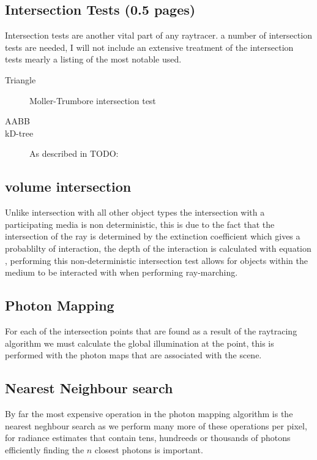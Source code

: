 \subsection{Intersection Tests (0.5 pages)}
Intersection tests are another vital part of any raytracer. a number of intersection tests are needed, I will not include
an extensive treatment of the intersection tests mearly a listing of the most notable used.

\begin{description}
\item[Triangle] Moller-Trumbore intersection test \cite{MolTru97}
\item[AABB]
\item[kD-tree] As described in TODO:
\end{description}

\subsection{volume intersection}
Unlike intersection with all other object types the intersection with a participating media is non deterministic, this is
due to the fact that the intersection of the ray is determined by the extinction coefficient which gives a probablilty
of interaction, the depth of the interaction is calculated with equation , performing this non-deterministic
intersection test allows for objects within the medium to be interacted with when performing ray-marching.

\subsection{Photon Mapping}
For each of the intersection points that are found as a result of the raytracing algorithm we must calculate the global
illumination at the point, this is performed with the photon maps that are associated with the scene.

\subsection{Nearest Neighbour search}
By far the most expensive operation in the photon mapping algorithm is the nearest neghbour search as we perform
many more of these operations per pixel, for radiance estimates that contain tens, hundreeds or thousands of photons
efficiently finding the $n$ closest photons is important.

